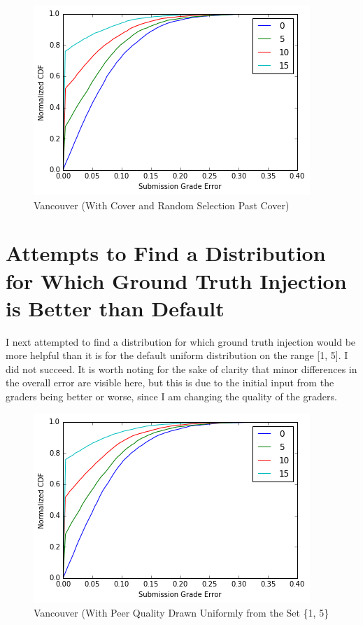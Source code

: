 \documentclass{article}
\begin{document}
	\begin{figure}[h]
		\includegraphics{vancouver-cover-random.png}
		\caption{Vancouver (With Cover and Random Selection Past Cover)}
	\end{figure}
	
	
	\section{Attempts to Find a Distribution for Which Ground Truth Injection is Better than Default}
	I next attempted to find a distribution for which ground truth injection would be more helpful than it is for the default uniform distribution on the range [1, 5]. I did not succeed. It is worth noting for the sake of clarity that minor differences in the overall error are visible here, but this is due to the initial input from the graders being better or worse, since I am changing the quality of the graders.
	
	\begin{figure}[h]
		\includegraphics{vancouver-bimodal.png}
		\caption{Vancouver (With Peer Quality Drawn Uniformly from the Set \{1, 5\}}
	\end{figure}
	
\end{document}
